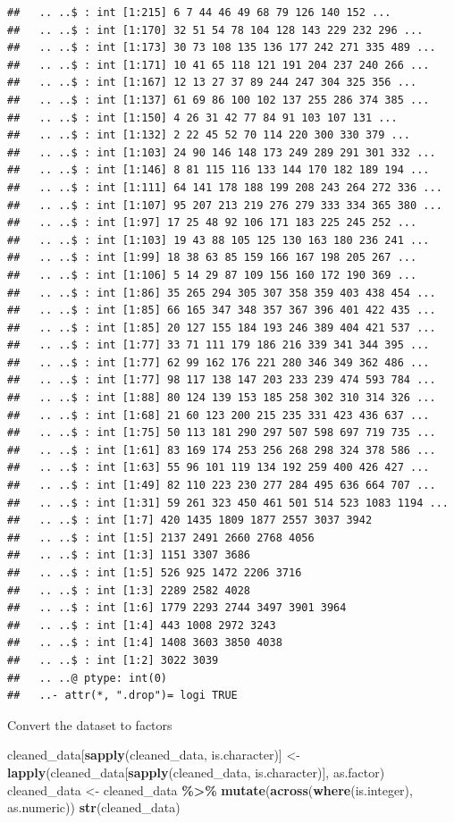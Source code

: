 \documentclass[
]{article}
\newenvironment{Shaded}{\begin{snugshade}}{\end{snugshade}}
\newcommand{\FunctionTok}[1]{\textcolor[rgb]{0.13,0.29,0.53}{\textbf{#1}}}
\newcommand{\NormalTok}[1]{#1}
\newcommand{\OtherTok}[1]{\textcolor[rgb]{0.56,0.35,0.01}{#1}}
\newcommand{\SpecialCharTok}[1]{\textcolor[rgb]{0.81,0.36,0.00}{\textbf{#1}}}
\begin{document}
\begin{verbatim}
##   .. ..$ : int [1:215] 6 7 44 46 49 68 79 126 140 152 ...
##   .. ..$ : int [1:170] 32 51 54 78 104 128 143 229 232 296 ...
##   .. ..$ : int [1:173] 30 73 108 135 136 177 242 271 335 489 ...
##   .. ..$ : int [1:171] 10 41 65 118 121 191 204 237 240 266 ...
##   .. ..$ : int [1:167] 12 13 27 37 89 244 247 304 325 356 ...
##   .. ..$ : int [1:137] 61 69 86 100 102 137 255 286 374 385 ...
##   .. ..$ : int [1:150] 4 26 31 42 77 84 91 103 107 131 ...
##   .. ..$ : int [1:132] 2 22 45 52 70 114 220 300 330 379 ...
##   .. ..$ : int [1:103] 24 90 146 148 173 249 289 291 301 332 ...
##   .. ..$ : int [1:146] 8 81 115 116 133 144 170 182 189 194 ...
##   .. ..$ : int [1:111] 64 141 178 188 199 208 243 264 272 336 ...
##   .. ..$ : int [1:107] 95 207 213 219 276 279 333 334 365 380 ...
##   .. ..$ : int [1:97] 17 25 48 92 106 171 183 225 245 252 ...
##   .. ..$ : int [1:103] 19 43 88 105 125 130 163 180 236 241 ...
##   .. ..$ : int [1:99] 18 38 63 85 159 166 167 198 205 267 ...
##   .. ..$ : int [1:106] 5 14 29 87 109 156 160 172 190 369 ...
##   .. ..$ : int [1:86] 35 265 294 305 307 358 359 403 438 454 ...
##   .. ..$ : int [1:85] 66 165 347 348 357 367 396 401 422 435 ...
##   .. ..$ : int [1:85] 20 127 155 184 193 246 389 404 421 537 ...
##   .. ..$ : int [1:77] 33 71 111 179 186 216 339 341 344 395 ...
##   .. ..$ : int [1:77] 62 99 162 176 221 280 346 349 362 486 ...
##   .. ..$ : int [1:77] 98 117 138 147 203 233 239 474 593 784 ...
##   .. ..$ : int [1:88] 80 124 139 153 185 258 302 310 314 326 ...
##   .. ..$ : int [1:68] 21 60 123 200 215 235 331 423 436 637 ...
##   .. ..$ : int [1:75] 50 113 181 290 297 507 598 697 719 735 ...
##   .. ..$ : int [1:61] 83 169 174 253 256 268 298 324 378 586 ...
##   .. ..$ : int [1:63] 55 96 101 119 134 192 259 400 426 427 ...
##   .. ..$ : int [1:49] 82 110 223 230 277 284 495 636 664 707 ...
##   .. ..$ : int [1:31] 59 261 323 450 461 501 514 523 1083 1194 ...
##   .. ..$ : int [1:7] 420 1435 1809 1877 2557 3037 3942
##   .. ..$ : int [1:5] 2137 2491 2660 2768 4056
##   .. ..$ : int [1:3] 1151 3307 3686
##   .. ..$ : int [1:5] 526 925 1472 2206 3716
##   .. ..$ : int [1:3] 2289 2582 4028
##   .. ..$ : int [1:6] 1779 2293 2744 3497 3901 3964
##   .. ..$ : int [1:4] 443 1008 2972 3243
##   .. ..$ : int [1:4] 1408 3603 3850 4038
##   .. ..$ : int [1:2] 3022 3039
##   .. ..@ ptype: int(0) 
##   ..- attr(*, ".drop")= logi TRUE
\end{verbatim}

Convert the dataset to factors

\begin{Shaded}
\begin{Highlighting}[]
\NormalTok{cleaned\_data[}\FunctionTok{sapply}\NormalTok{(cleaned\_data, is.character)] }\OtherTok{\textless{}{-}} \FunctionTok{lapply}\NormalTok{(cleaned\_data[}\FunctionTok{sapply}\NormalTok{(cleaned\_data, is.character)], as.factor)}
\NormalTok{cleaned\_data }\OtherTok{\textless{}{-}}\NormalTok{ cleaned\_data }\SpecialCharTok{\%\textgreater{}\%} \FunctionTok{mutate}\NormalTok{(}\FunctionTok{across}\NormalTok{(}\FunctionTok{where}\NormalTok{(is.integer), as.numeric))}
\FunctionTok{str}\NormalTok{(cleaned\_data)}
\end{Highlighting}
\end{Shaded}
\end{document}
